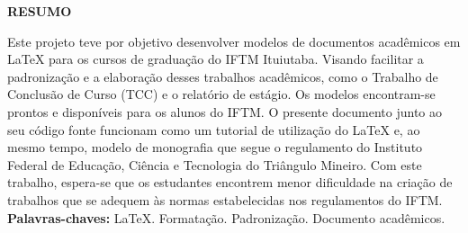 \newpage
\thispagestyle{empty}
\begin{center}
\textbf{RESUMO}
\end{center}
\begin{singlespace}
Este projeto teve por objetivo desenvolver modelos de documentos acadêmicos em LaTeX para os cursos de graduação do IFTM Ituiutaba. Visando facilitar a padronização e a elaboração desses trabalhos acadêmicos, como o Trabalho de Conclusão de Curso (TCC) e o relatório de estágio. Os modelos encontram-se prontos e disponíveis para os alunos do IFTM. O presente documento junto ao seu código fonte funcionam como um tutorial de utilização do LaTeX e, ao mesmo tempo, modelo de monografia que segue o regulamento do Instituto Federal de Educação, Ciência e Tecnologia do Triângulo Mineiro. Com este trabalho, espera-se que os estudantes encontrem menor dificuldade na criação de trabalhos que se adequem às normas estabelecidas nos regulamentos do IFTM.\\

\noindent \textbf{Palavras-chaves:} LaTeX. Formatação. Padronização. Documento acadêmicos.
\end{singlespace}
